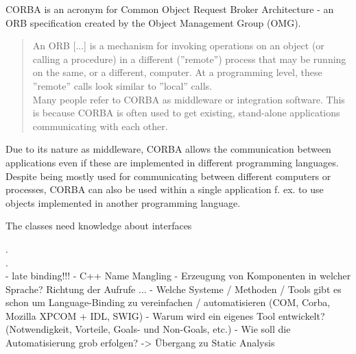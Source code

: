 CORBA is an acronym for Common Object Request Broker Architecture - an ORB specification created by the Object Management Group (OMG).

\begin{quotation}
An ORB [...] is a mechanism for invoking operations on an object (or calling a procedure) in a different (''remote'') process that may be running on the same, or a different, computer. At a programming level, these ''remote'' calls look similar to ''local'' calls.\\
Many people refer to CORBA as middleware or integration software. This is because CORBA is often used to get existing, stand-alone applications communicating with each other.
\end{quotation}

Due to its nature as middleware, CORBA allows the communication between applications even if these are implemented in different programming languages. Despite being mostly used for communicating between different computers or processes, CORBA can also be used within a single application f. ex. to use objects implemented in another programming language.

The classes need knowledge about interfaces

.\\
.\\
  - late binding!!!
  - C++ Name Mangling
  - Erzeugung von Komponenten in welcher Sprache? Richtung der Aufrufe ...
  - Welche Systeme / Methoden / Tools gibt es schon um Language-Binding zu vereinfachen / automatisieren (COM, Corba, Mozilla XPCOM + IDL, SWIG)
  - Warum wird ein eigenes Tool entwickelt? (Notwendigkeit, Vorteile, Goals- und Non-Goals, etc.)
  - Wie soll die Automatisierung grob erfolgen? -> Übergang zu Static Analysis